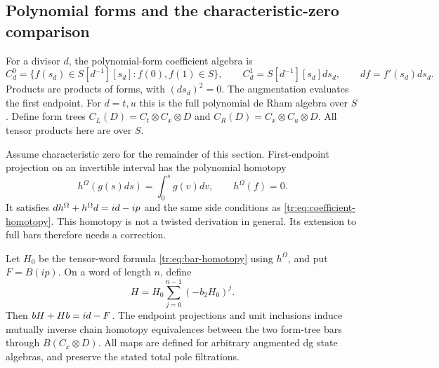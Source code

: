 \subsection{Polynomial forms and the characteristic-zero comparison}

For a divisor \(d\), the polynomial-form coefficient algebra is
\[
 C_d^0=\{f(s_d)\in S[d^{-1}][s_d]:f(0),f(1)\in S\},
 \qquad C_d^1=S[d^{-1}][s_d]ds_d,
 \qquad df=f'(s_d)ds_d.
\]
Products are products of forms, with \((ds_d)^2=0\).
The augmentation evaluates the first endpoint.  For \(d=t,u\)
this is the full polynomial de Rham algebra over \(S\).
Define form trees \(C_L(D)=C_t\otimes C_x\otimes D\)
and \(C_R(D)=C_x\otimes C_u\otimes D\).
All tensor products here are over \(S\).

Assume characteristic zero for the remainder of this section.
First-endpoint projection on an invertible interval has the
polynomial homotopy
\[
 h^{\Omega}(g(s)ds)=\int_0^s g(v)dv,
 \qquad h^{\Omega}(f)=0.
\]
It satisfies \(dh^{\Omega}+h^{\Omega}d=id-ip\) and
the same side conditions as \eqref{tr:eq:coefficient-homotopy}.
This homotopy is not a twisted derivation in general.  Its extension
to full bars therefore needs a correction.

\begin{lemma}
\label{tr:lem:form-bar-homotopy}
Let \(H_0\) be the tensor-word formula
\eqref{tr:eq:bar-homotopy} using \(h^{\Omega}\), and put
\(F=B(ip)\).  On a word of length \(n\), define
\begin{equation}\label{tr:eq:perturbed-homotopy}
 H=H_0\sum_{j=0}^{n-1}(-b_2H_0)^j.
\end{equation}
Then \(bH+Hb=id-F\).  The endpoint projections and
unit inclusions induce mutually inverse chain homotopy equivalences
between the two form-tree bars through \(B(C_x\otimes D)\).
All maps are defined for arbitrary augmented dg state algebras,
and preserve the stated total pole filtrations.
\end{lemma}

